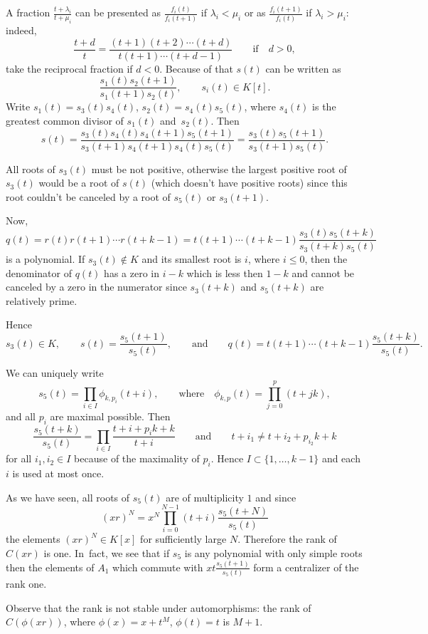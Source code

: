 \documentclass[pdftex]{sigma}
\numberwithin{equation}{section}
\newcommand{\la}{\lambda}
\begin{document}
A fraction $\frac{t + \la_i}{t + \mu_i}$ can be presented as $\frac{f_i(t)}{f_i(t+1)}$ if $\la_i < \mu_i$ or as $\frac{f_i(t+1)}{f_i(t)}$ if $\la_i > \mu_i$: indeed,
\[
\frac{t + d}{t} = \frac{(t+1) (t+2) \cdots(t+d)}{t(t+1)\cdots (t+d-1)}\qquad \text{if}\quad d > 0,
\]
take the reciprocal fraction if $d < 0$. Because of that $s(t)$ can be written as
\[
\frac{s_1(t)s_2(t+1)}{s_1(t+1)s_2(t)}, \qquad
s_i(t) \in K[t].
\]
Write
$s_1(t) = s_3(t)s_4(t)$, $s_2(t) =s_4(t)s_5(t)$,
where $s_4(t)$ is the greatest common divisor of $s_1(t)$ and~$s_2(t)$. Then
\[
s(t) = \frac{s_3(t)s_4(t)s_4(t+1)s_5(t+1)}{s_3(t+1)s_4(t+1)s_4(t)s_5(t)} = \frac{s_3(t)s_5(t+1)}{s_3(t+1)s_5(t)}.
\]

All roots of $s_3(t)$ must be not positive, otherwise the largest positive root of $s_3(t)$ would be a root of $s(t)$ (which doesn't have positive roots) since this root
couldn't be canceled by a root of $s_5(t)$ or $s_3(t+1)$.

Now,
\[
q(t) = r(t)r(t+1)\cdots r(t + k - 1) = t(t+1)\cdots(t+k-1)\frac{s_3(t)s_5(t+k)}{s_3(t+k)s_5(t)}
\]
is a polynomial. If $s_3(t) \not\in K$ and its smallest root is $i$, where $i \leq 0$, then the denominator of $q(t)$ has a zero in $i-k$ which is less then $1 - k$ and cannot be canceled by a zero in the numerator since $s_3(t+k)$ and $s_5(t+k)$ are relatively prime.

Hence
\[
s_3(t) \in K, \qquad
s(t) = \frac{s_5(t+1)}{s_5(t)},\qquad \text{and}\qquad
q(t) = t(t+1)\cdots(t+k-1) \frac{s_5(t+k)}{s_5(t)}.
\]

We can uniquely write
\[
s_5(t) = \prod_{i \in I}\phi_{k, p_i}(t+i), \qquad \text{where}\quad
\phi_{k,p}(t) = \prod_{j=0}^{p} (t + jk),
\]
and all $p_i$ are maximal possible.
Then
\[
\frac{s_5(t+k)}{s_5(t)} = \prod_{i \in I} \frac{t + i + p_ik + k}{t + i}\qquad
\text{and}\qquad
t + i_1 \neq t + i_2 + p_{i_2}k + k
\]
for all $i_1, i_2 \in I$ because of the
maximality of $p_i$. Hence $I \subset \{1, \dots, k-1\}$ and each $i$ is used at most once.

As we have seen, all roots of $s_5(t)$ are of multiplicity $1$
and since
\[
(xr)^N = x^N\prod_{i=0}^{N-1}(t+i)\frac{s_5(t+N)}{s_5(t)}
\]
the elements $(xr)^N \in K[x]$ for sufficiently large $N$. Therefore the rank of $C(xr)$ is one.
In~fact, we see that if $s_5$ is any polynomial with only simple roots then the elements of $A_1$ which commute with $xt\frac{s_5(t+1)}{s_5(t)}$ form a centralizer of the rank one.

Observe that the rank is not stable under automorphisms: the rank of $C(\phi(xr))$, where $\phi(x) = x + t^M$, $\phi(t) = t$ is $M + 1$.
\end{document}
